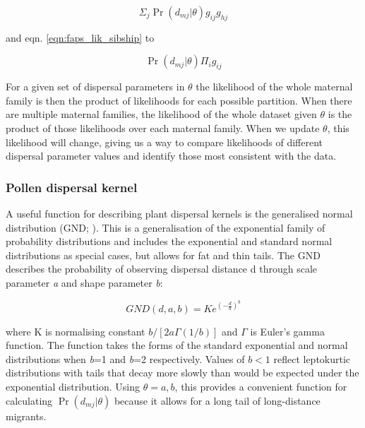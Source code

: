 \documentclass[10pt, a4paper, twocolumn]{article} %
\begin{document}
\begin{equation}\label{eqn:pairwise_with_covariates}
\Sigma_j \Pr(d_{mj} | \theta)g_{ij}g_{hj}
\end{equation}

and eqn. \ref{eqn:faps_lik_sibship} to

\begin{equation}
\label{sibship_with_covariates}
\Pr(d_{mj} | \theta)\Pi_i g_{ij}
\end{equation}

For a given set of dispersal parameters in $\theta$ the likelihood of the whole maternal family is then the product of likelihoods for each possible partition. When there are multiple maternal families, the likelihood of the whole dataset given $\theta$ is the product of those likelihoods over each maternal family. When we update $\theta$, this likelihood will change, giving us a way to compare likelihoods of different dispersal parameter values and identify those most consistent with the data.

\subsubsection{Pollen dispersal kernel}

A useful function for describing plant dispersal kernels is the generalised normal distribution (GND; \cite{clark1998trees,Nadarajah2005,kremer2012long}). This is a generalisation of the exponential family of probability distributions and includes the exponential and standard normal distributions as special cases, but allows for fat and thin tails. The GND describes the probability of observing dispersal distance d through scale parameter \textit{a} and shape parameter \textit{b}:

\begin{equation}
GND(d,a,b) =K e^{  (-\frac{d}{a} )^b }
\label{eqn:GND}
\end{equation}

where K is normalising constant $b/[2a\Gamma(1/b)]$ and $\Gamma$ is Euler's gamma function. The function takes the forms of the standard exponential and normal distributions when \textit{b}=1 and \textit{b}=2 respectively. Values of $b<1$ reflect leptokurtic distributions with tails that decay more slowly than would be expected under the exponential distribution. Using $\theta={a,b}$, this provides a convenient function for calculating $\Pr(d_{mj}|\theta)$ because it allows for a long tail of long-distance migrants.
\end{document}
